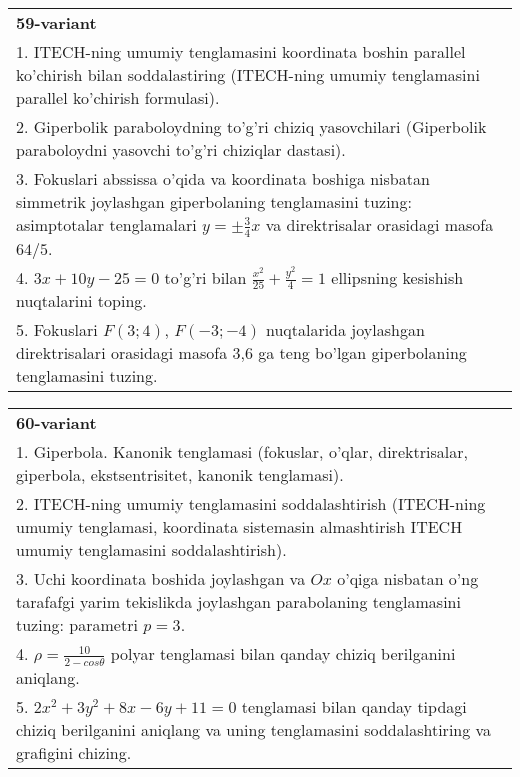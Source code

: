 \documentclass{article}
\begin{document}
\begin{tabular}{m{17cm}}
\textbf{59-variant}\\
1. ITECH-ning umumiy tenglamasini koordinata boshin parallel ko'chirish bilan soddalastiring (ITECH-ning umumiy tenglamasini parallel ko'chirish formulasi).\\

2. Giperbolik paraboloydning to'g'ri chiziq yasovchilari (Giperbolik paraboloydni yasovchi to'g'ri chiziqlar dastasi).\\

3. Fokuslari abssissa o'qida va koordinata boshiga nisbatan simmetrik joylashgan giperbolaning tenglamasini tuzing: asimptotalar tenglamalari $y=\pm \frac{3}{4}x$ va direktrisalar orasidagi masofa $64/5$.\\

4. $3x + 10y - 25 = 0$ to'g'ri bilan $\frac{x^{2}}{25} + \frac{y^{2}}{4} = 1$ ellipsning kesishish nuqtalarini toping.  \\

5. Fokuslari $F(3;4)$, $F(-3;-4)$ nuqtalarida joylashgan direktrisalari orasidagi masofa 3,6 ga teng bo'lgan giperbolaning tenglamasini tuzing.  
\end{tabular}
\vspace{1cm}


\begin{tabular}{m{17cm}}
\textbf{60-variant}\\
1. Giperbola. Kanonik tenglamasi (fokuslar, o'qlar, direktrisalar, giperbola, ekstsentrisitet, kanonik tenglamasi).\\

2. ITECH-ning umumiy tenglamasini soddalashtirish (ITECH-ning umumiy tenglamasi, koordinata sistemasin almashtirish ITECH umumiy tenglamasini soddalashtirish).\\

3. Uchi koordinata boshida joylashgan va $Ox$ o'qiga nisbatan o'ng tarafafgi yarim tekislikda joylashgan parabolaning tenglamasini tuzing: parametri $p=3$.\\

4. $\rho = \frac{10}{2 - cos\theta}$ polyar tenglamasi bilan qanday chiziq berilganini aniqlang.  \\

5. $2x^{2} + 3y^{2} + 8x - 6y + 11 = 0$ tenglamasi bilan qanday tipdagi chiziq berilganini aniqlang va uning tenglamasini soddalashtiring va grafigini chizing.  
\end{tabular}
\vspace{1cm}
\end{document}
